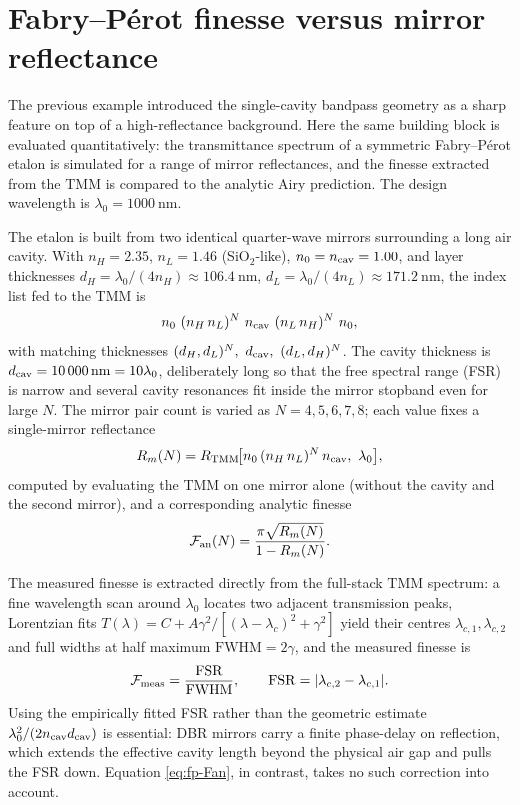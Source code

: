\section{Fabry--P\'erot finesse versus mirror reflectance}

The previous example introduced the single-cavity bandpass geometry as a
sharp feature on top of a high-reflectance background. Here the same
building block is evaluated quantitatively: the transmittance spectrum of
a symmetric Fabry--P\'erot etalon is simulated for a range of mirror
reflectances, and the finesse extracted from the TMM is compared to the
analytic Airy prediction. The design wavelength is
$\lambda_0 = \SI{1000}{\nano\metre}$.

The etalon is built from two identical quarter-wave mirrors surrounding a
long air cavity. With $n_H = 2.35$, $n_L = 1.46$ (SiO$_2$-like),
$n_0 = n_{\rm cav} = 1.00$, and layer thicknesses
$d_H = \lambda_0/(4 n_H) \approx \SI{106.4}{\nano\metre}$,
$d_L = \lambda_0/(4 n_L) \approx \SI{171.2}{\nano\metre}$, the index list
fed to the TMM is
\[
  n_0\ (n_H\,n_L)^{N}\ n_{\rm cav}\ (n_L\,n_H)^{N}\ n_0,
\]
with matching thicknesses
$(d_H, d_L)^{N},\ d_{\rm cav},\ (d_L, d_H)^{N}$. The cavity thickness is
$d_{\rm cav} = \SI{10000}{\nano\metre} = 10\lambda_0$, deliberately long so
that the free spectral range (FSR) is narrow and several cavity resonances
fit inside the mirror stopband even for large $N$. The mirror pair count
is varied as $N = 4, 5, 6, 7, 8$; each value fixes a single-mirror
reflectance
\begin{equation}
  R_m(N) = R_{\rm TMM}\!\bigl[n_0\,(n_H\,n_L)^{N}\,n_{\rm cav},\ \lambda_0\bigr], \label{eq:fp-Rm}
\end{equation}
computed by evaluating the TMM on one mirror alone (without the cavity
and the second mirror), and a corresponding analytic finesse
\begin{equation}
  \mathcal{F}_{\rm an}(N) = \frac{\pi\sqrt{R_m(N)}}{1 - R_m(N)}. \label{eq:fp-Fan}
\end{equation}

The measured finesse is extracted directly from the full-stack TMM
spectrum: a fine wavelength scan around $\lambda_0$ locates two adjacent
transmission peaks, Lorentzian fits $T(\lambda) = C + A\gamma^{2}/[(\lambda
- \lambda_c)^{2} + \gamma^{2}]$ yield their centres $\lambda_{c,1},
\lambda_{c,2}$ and full widths at half maximum
$\mathrm{FWHM} = 2\gamma$, and the measured finesse is
\begin{equation}
  \mathcal{F}_{\rm meas} = \frac{\mathrm{FSR}}{\mathrm{FWHM}},\qquad \mathrm{FSR} = |\lambda_{c,2} - \lambda_{c,1}|. \label{eq:fp-Fmeas}
\end{equation}
Using the empirically fitted FSR rather than the geometric estimate
$\lambda_0^{2}/(2 n_{\rm cav} d_{\rm cav})$ is essential: DBR mirrors
carry a finite phase-delay on reflection, which extends the effective
cavity length beyond the physical air gap and pulls the FSR down. Equation
\eqref{eq:fp-Fan}, in contrast, takes no such correction into account.

